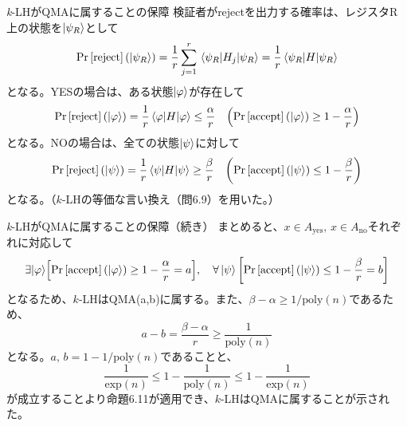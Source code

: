 \documentclass[11pt,aspectratio=169,xcolor=dvipsnames,table,dvipdfmx]{beamer}
\theoremstyle{definition}
\begin{document}
\begin{frame}{\textit{k}-LHがQMAに属することの保障}
  検証者がrejectを出力する確率は、レジスタR上の状態を$\ket{\psi_R}$として
  \begin{equation*}
    \Pr\qty[\text{reject}](\ket{\psi_R}) = \frac{1}{r}\sum_{j=1}^{r}\ev{H_j}{\psi_R} = \frac{1}{r}\ev{H}{\psi_R}
  \end{equation*}
  となる。YESの場合は、ある状態$\ket{\varphi}$が存在して
  \begin{equation*}
    \Pr\qty[\text{reject}](\ket{\varphi}) = \frac{1}{r}\ev{H}{\varphi} \leq \frac{\alpha}{r} \quad\qty(\Pr\qty[\text{accept}](\ket{\varphi})\geq 1-\frac{\alpha}{r})
  \end{equation*}
  となる。NOの場合は、全ての状態$\ket{\psi}$に対して
  \begin{equation*}
    \Pr\qty[\text{reject}](\ket{\psi}) = \frac{1}{r}\ev{H}{\psi} \geq \frac{\beta}{r} \quad\qty(\Pr\qty[\text{accept}](\ket{\psi})\leq 1-\frac{\beta}{r})
  \end{equation*}
  となる。（$k$-LHの等価な言い換え（問6.9）を用いた。）
\end{frame}
\begin{frame}{\textit{k}-LHがQMAに属することの保障（続き）}
  まとめると、$x\in A_{\text{yes}},\,x\in A_{\text{no}}$それぞれに対応して
  \begin{equation}
    \exists{\ket{\varphi}}\qty[\Pr\qty[\text{accept}](\ket{\varphi}) \geq 1- \frac{\alpha}{r} = a] ,\quad \forall \ket{\psi}\qty[\Pr\qty[\text{accept}](\ket{\psi}) \leq 1- \frac{\beta}{r} = b]
  \end{equation}
  となるため、$k$-LHはQMA(a,b)に属する。また、$\beta-\alpha\geq 1/\text{poly}(n)$であるため、
  \begin{equation}
    a-b = \frac{\beta-\alpha}{r} \geq \frac{1}{\text{poly}(n)}
  \end{equation}
  となる。$a,\,b = 1-1/\text{poly}(n)$であることと、
  \begin{equation}
    \frac{1}{\text{exp}(n)} \leq 1-\frac{1}{\text{poly}(n)} \leq 1-\frac{1}{\text{exp}(n)}
  \end{equation}
  が成立することより命題6.11が適用でき、$k$-LHはQMAに属することが示された。
\end{frame}
\end{document}
